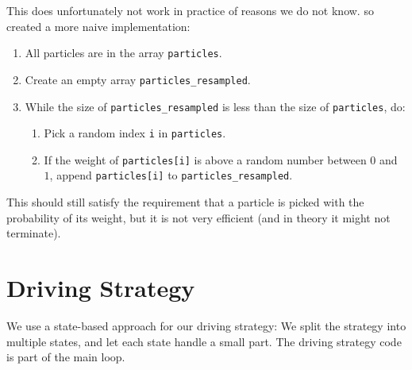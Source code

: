 \documentclass[a4paper,12pt]{article}
\begin{document}
This does unfortunately not work in practice of reasons we do not know. so
created a more naive implementation:

\begin{enumerate}
\item All particles are in the array \texttt{particles}.
\item Create an empty array \texttt{particles_resampled}.
\item While the size of \texttt{particles_resampled} is less than the size of
\texttt{particles}, do:
\begin{enumerate}
\item Pick a random index \texttt{i} in \texttt{particles}.
\item If the weight of \texttt{particles[i]} is above a random number between
$0$ and $1$, append \texttt{particles[i]} to \texttt{particles_resampled}.
\end{enumerate}
\end{enumerate}

This should still satisfy the requirement that a particle is picked with the
probability of its weight, but it is not very efficient (and in theory it might
not terminate).


\section{Driving Strategy}

We use a state-based approach for our driving strategy: We split the strategy
into multiple states, and let each state handle a small part.  The driving
strategy code is part of the main loop.
\end{document}
